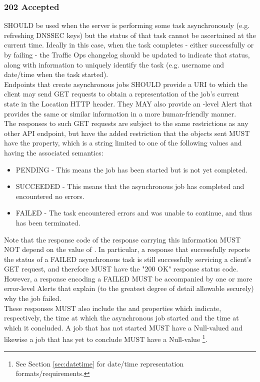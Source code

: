 \subsubsection{202 Accepted}
 SHOULD be used when the server is performing some task asynchronously (e.g. refreshing DNSSEC keys) but the status of that task
cannot be ascertained at the current time. Ideally in this case, when the task completes - either successfully or by failing - the Traffic Ops changelog
should be updated to indicate that status, along with information to uniquely identify the task (e.g. username and date/time when the task started).\\
Endpoints that create asynchronous jobs SHOULD provide a URI to which the
client may send GET requests to obtain a representation of the job's current
state in the Location HTTP header. They MAY also provide an -level
Alert that provides the same or similar information in a more human-friendly
manner.\\
The responses to such GET requests are subject to the same restrictions as any
other API endpoint, but have the added restriction that the 
objects sent MUST have the  property, which is a string limited to
one of the following values and having the associated semantics:

\begin{itemize}
	\item PENDING - This means the job has been started but is not yet
		completed.
	\item SUCCEEDED - This means that the asynchronous job has completed and
		encountered no errors.
	\item FAILED - The task encountered errors and was unable to continue, and
		thus has been terminated.
\end{itemize}

Note that the response code of the response carrying this information MUST NOT
depend on the value of . In particular, a response that
successfully reports the status of a FAILED asynchronous task is still
successfully servicing a client's GET request, and therefore MUST have the
"200 OK" response status code. However, a response encoding a FAILED
 MUST be accompanied by one or more error-level Alerts that explain
(to the greatest degree of detail allowable securely) why the job failed.\\
These responses MUST also include the  and 
properties which indicate, respectively, the time at which the asynchronous job
started and the time at which it concluded. A job that has not started MUST have
a Null-valued  and likewise a job that has yet to conclude MUST
have a Null-value \footnote{See Section \ref{sec:datetime} for
date/time representation formats/requirements.}.

